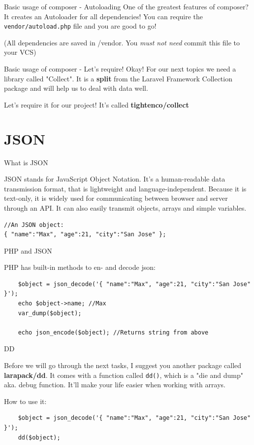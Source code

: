 \begin{frame}{Basic usage of composer - Autoloading}
	One of the greatest features of composer? It creates an Autoloader for all dependencies!
	You can require the \texttt{vendor/autoload.php} file and you are good to go!\pause
	
	(All dependencies are saved in /vendor. You \emph{must not need} commit this file to your VCS)
\end{frame}


\begin{frame}{Basic usage of composer - Let's require!}
	Okay! For our next topics we need a library called "Collect". It is a \textbf{split} from the Laravel Framework Collection package and will help us to deal with data well.
	
	Let's require it for our project! It's called \textbf{tightenco/collect}
	
\end{frame}

\section{JSON}

\begin{frame}[fragile]{What is JSON}

	JSON stands for JavaScript Object Notation. It's a human-readable data transmission format, that is lightweight and language-independent. Because it is text-only, it is widely used for communicating between browser and server through an API. It can also easily transmit objects, arrays and simple variables.\pause
\begin{lstlisting}
//An JSON object:
{ "name":"Max", "age":21, "city":"San Jose" };
\end{lstlisting}

\end{frame}

\begin{frame}[fragile]{PHP and JSON}
	
	PHP has built-in methods to en- and decode json:
	\begin{lstlisting}
	$object = json_decode('{ "name":"Max", "age":21, "city":"San Jose" }');
	echo $object->name; //Max
	var_dump($object);
	
	echo json_encode($object); //Returns string from above
	\end{lstlisting}
\end{frame}

\begin{frame}[fragile]{DD}
	
	Before we will go through the next tasks, I suggest you another package called \textbf{larapack/dd}. It comes with a function called \texttt{dd()}, which is a "die and dump" aka. debug function. It'll make your life easier when working with arrays. \pause
	
	How to use it:
	\begin{lstlisting}
	$object = json_decode('{ "name":"Max", "age":21, "city":"San Jose" }');
	dd($object);
	\end{lstlisting}
\end{frame}

